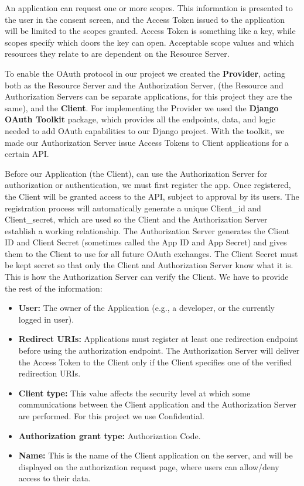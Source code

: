 An application can request one or more scopes. This information is presented to the user in the consent screen, and the Access Token issued to the application will be limited to the scopes granted. Access Token is something like a key, while scopes specify which doors the key can open. Acceptable scope values and which resources they relate to are dependent on the Resource Server.

To enable the OAuth protocol in our project we created the \textbf{Provider}, acting both as the Resource Server and the Authorization Server, (the Resource and Authorization Servers can be separate applications, for this project they are the same), and the \textbf{Client}.
For implementing the Provider we used the \textbf{Django OAuth Toolkit}\cite{oauthtoolkit} package, which provides all the endpoints, data, and logic needed to add OAuth capabilities to our Django project.
With the toolkit, we made our Authorization Server issue Access Tokens to Client applications for a certain API.

Before our Application (the Client), can use the Authorization Server for authorization or authentication, we must first register the app. Once registered, the Client will be granted access to the API, subject to approval by its users. The registration process will automatically generate a unique Client\_id and Client\_secret, which are used so the Client and the Authorization Server establish a working relationship. The Authorization Server generates the Client ID and Client Secret (sometimes called the App ID and App Secret) and gives them to the Client to use for all future OAuth exchanges. The Client Secret must be kept secret so that only the Client and Authorization Server know what it is. This is how the Authorization Server can verify the Client. We have to provide the rest of the information:

\begin{itemize}

	\item \textbf{User:} The owner of the Application (e.g., a developer, or the currently logged in user).

	\item \textbf{Redirect URIs:} Applications must register at least one redirection endpoint before using the authorization endpoint. The Authorization Server will deliver the Access Token to the Client only if the Client specifies one of the verified redirection URIs.

	\item \textbf{Client type:} This value affects the security level at which some communications between the Client application and the Authorization Server are performed. For this project we use Confidential.

	\item \textbf{Authorization grant type:} Authorization Code.

	\item \textbf{Name:} This is the name of the Client application on the server, and will be displayed on the authorization request page, where users can allow/deny access to their data.

\end{itemize}

